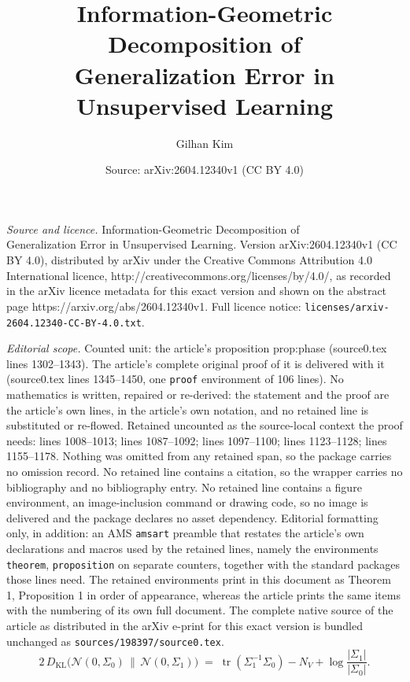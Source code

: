 \documentclass[10pt,a4paper]{amsart}
\title{Information-Geometric Decomposition of\\ Generalization Error in Unsupervised Learning}
\author{Gilhan Kim}
\date{Source: arXiv:2604.12340v1 (CC BY 4.0)}
\newcommand{\KL}{D_{\mathrm{KL}}}
\newcommand{\NV}{N_V}
\newcommand{\tr}{\operatorname{tr}}
\begin{document}
\maketitle

\noindent\emph{Source and licence.} Information-Geometric Decomposition of\\ Generalization Error in Unsupervised Learning. Version arXiv:2604.12340v1 (CC BY 4.0), distributed by arXiv under the Creative Commons Attribution 4.0 International licence, http://creativecommons.org/licenses/by/4.0/, as recorded in the arXiv licence metadata for this exact version and shown on the abstract page https://arxiv.org/abs/2604.12340v1. Full licence notice: \texttt{licenses/arxiv-2604.12340-CC-BY-4.0.txt}.\par\smallskip

\noindent\textit{Editorial scope.} Counted unit: the article's proposition prop:phase (source0.tex lines 1302--1343). The article's complete original proof of it is delivered with it (source0.tex lines 1345--1450, one \texttt{proof} environment of 106 lines). No mathematics is written, repaired or re-derived: the statement and the proof are the article's own lines, in the article's own notation, and no retained line is substituted or re-flowed.  Retained uncounted as the source-local context the proof needs: lines 1008--1013; lines 1087--1092; lines 1097--1100; lines 1123--1128; lines 1155--1178.  Nothing was omitted from any retained span, so the package carries no omission record.  No retained line contains a citation, so the wrapper carries no bibliography and no bibliography entry.  No retained line contains a figure environment, an image-inclusion command or drawing code, so no image is delivered and the package declares no asset dependency.  Editorial formatting only, in addition: an AMS \texttt{amsart} preamble that restates the article's own declarations and macros used by the retained lines, namely the environments \texttt{theorem}, \texttt{proposition} on separate counters, together with the standard packages those lines need.  The retained environments print in this document as Theorem 1, Proposition 1 in order of appearance, whereas the article prints the same items with the numbering of its own full document.  The complete native source of the article as distributed in the arXiv e-print for this exact version is bundled unchanged as \texttt{sources/198397/source0.tex}.
\begin{equation}
  2\,\KL\!\big(\mathcal{N}(0,\Sigma_{0}) \,\big\|\, \mathcal{N}(0,\Sigma_{1})\big)
  \;=\;
  \tr(\Sigma_{1}^{-1}\Sigma_{0}) - \NV + \log\frac{|\Sigma_{1}|}{|\Sigma_{0}|}.
  \label{eq:gausKL}
\end{equation}
\end{document}
